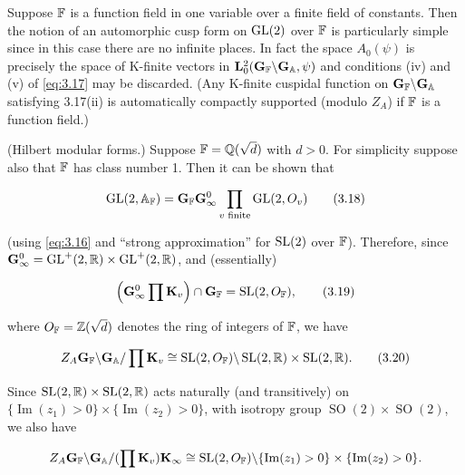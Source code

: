 \begin{remark}\label{rem:3.9}

Suppose $\mathbb{F}$ is a function field in one variable over a finite field of constants. Then the notion of an automorphic cusp form on $\operatorname{GL}(2)$ over $\mathbb{F}$ is particularly simple since in this case there are no infinite places. In fact the space $A_0(\psi)$ is precisely the space of K-finite vectors in $\mathbf{L}_0^2(\mathbf{G}_{\mathbb{F}}\backslash\mathbf{G}_{\mathbb{A}},\psi)$ and conditions (iv) and (v) of \eqref{eq:3.17} may be discarded. (Any K-finite cuspidal function on $\mathbf{G}_{\mathbb{F}}\backslash\mathbf{G}_{\mathbb{A}}$ satisfying 3.17(ii) is automatically compactly supported (modulo $Z_A$) if $\mathbb{F}$ is a function field.)

\end{remark}

\begin{example}\label{exa:3.10}

(Hilbert modular forms.) Suppose $\mathbb{F} = \mathbb{Q}(\sqrt{d})$ with $d > 0$. For simplicity suppose also that $\mathbb{F}$ has class number 1. Then it can be shown that

\begin{equation}\label{eq:3.18}
\operatorname{GL}(2,\mathbb{A}_{\mathbb{F}}) = \mathbf{G}_{\mathbb{F}}\mathbf{G}_\infty^0\prod_{v\text{ finite}}\operatorname{GL}(2,O_v)\tag{3.18}
\end{equation}

(using \eqref{eq:3.16} and ``strong approximation'' for $\operatorname{SL}(2)$ over $\mathbb{F}$). Therefore, since $\mathbf{G}_\infty^0 = \operatorname{GL}^+(2,\mathbb{R})\times\operatorname{GL}^+(2,\mathbb{R})$, and (essentially)

\begin{equation}\label{eq:3.19}
\left(\mathbf{G}_\infty^0\prod\mathbf{K}_v\right)\cap\mathbf{G}_{\mathbb{F}} = \operatorname{SL}(2,O_{\mathbb{F}}),\tag{3.19}
\end{equation}

where $O_{\mathbb{F}} = \mathbb{Z}(\sqrt{d})$ denotes the ring of integers of $\mathbb{F}$, we have

\begin{equation}\label{eq:3.20}
Z_A\mathbf{G}_{\mathbb{F}}\backslash\mathbf{G}_{\mathbb{A}}/\prod\mathbf{K}_v \cong \operatorname{SL}(2,O_{\mathbb{F}})\backslash\operatorname{SL}(2,\mathbb{R})\times\operatorname{SL}(2,\mathbb{R}).\tag{3.20}
\end{equation}

Since $\operatorname{SL}(2,\mathbb{R})\times\operatorname{SL}(2,\mathbb{R})$ acts naturally (and transitively) on $\{\operatorname{Im}(z_1) > 0\}\times\{\operatorname{Im}(z_2) > 0\}$, with isotropy group $\operatorname{SO}(2)\times\operatorname{SO}(2)$, we also have

\[
Z_A\mathbf{G}_{\mathbb{F}}\backslash\mathbf{G}_{\mathbb{A}}/(\prod\mathbf{K}_v)\mathbf{K}_\infty \cong \operatorname{SL}(2,O_{\mathbb{F}})\backslash\{\operatorname{Im}(z_1) > 0\}\times\{\operatorname{Im}(z_2) > 0\}.
\]


\end{example}
